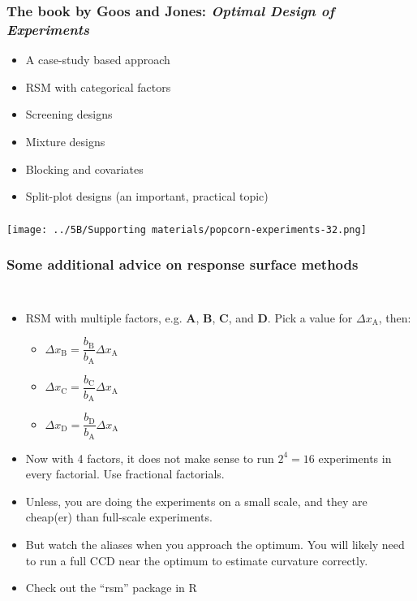\begin{frame}\frametitle{The book by Goos and Jones: \emph{Optimal Design of Experiments}}
	\begin{itemize}
		\item	A case-study based approach \pause
		\item	RSM with categorical factors \pause
		\item	Screening designs \pause
		\item	Mixture designs \pause
		\item	Blocking and covariates \pause
		\item	Split-plot designs (an important, practical topic) 
	\end{itemize}
\end{frame}

\begin{frame}\frametitle{}
	\centerline{\texttt{[image: ../5B/Supporting materials/popcorn-experiments-32.png]}}
\end{frame}

\begin{frame}\frametitle{Some additional advice on response surface methods}
	
	\begin{columns}[T]
			\begin{itemize}
				\item	RSM with multiple factors, e.g. \textbf{A}, \textbf{B}, \textbf{C}, and \textbf{D}. Pick a
				value for $\Delta x_\text{A}$, then:
				\begin{itemize}
					\item	$\Delta x_\text{B} = \dfrac{b_\text{B}}{b_\text{A}} \Delta x_\text{A}$
					\item	$\Delta x_\text{C} = \dfrac{b_\text{C}}{b_\text{A}} \Delta x_\text{A}$
					\item	$\Delta x_\text{D} = \dfrac{b_\text{D}}{b_\text{A}} \Delta x_\text{A}$
				\end{itemize}
				
				\item	Now with 4 factors, it does not make sense to run $2^4=16$ experiments in every factorial. Use fractional factorials.
				\item	Unless, you are doing the experiments on a small scale, and they are cheap(er) than full-scale experiments.
				\item	But watch the aliases when you approach the optimum. You will likely need to run a full CCD near the optimum to estimate curvature correctly.
						\\
				\item	Check out the {\color{myOrange}``rsm''} package in R
						
			\end{itemize}
			
	\end{columns}
\end{frame}

